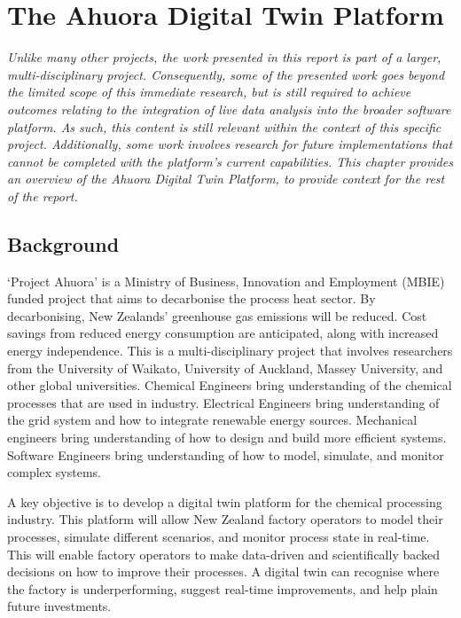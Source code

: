\chapter{The Ahuora Digital Twin Platform}


\textit{ Unlike many other projects, the work presented in this report is part of a larger, multi-disciplinary project. Consequently, some of the presented work goes beyond the limited scope of this immediate research, but is still required to achieve outcomes relating to the integration of live data analysis into the broader software platform. As such, this content is still relevant within the context of this specific project. Additionally, some work involves research for future implementations that cannot be completed with the platform's current capabilities. This chapter provides an overview of the Ahuora Digital Twin Platform, to provide context for the rest of the report.}

\section{Background}

`Project Ahuora' is a Ministry of Business, Innovation and Employment (MBIE) funded project that aims to decarbonise the process heat sector.
By decarbonising, New Zealands' greenhouse gas emissions will be reduced. Cost savings from reduced energy consumption are anticipated, along with increased energy independence.
This is a multi-disciplinary project that involves researchers from the University of Waikato, University of Auckland, Massey University,
and other global universities. Chemical Engineers bring understanding of the chemical processes that are used in industry. Electrical Engineers bring understanding of the grid system
and how to integrate renewable energy sources. Mechanical engineers bring understanding of how to design and build more efficient systems. Software Engineers bring understanding of how to
model, simulate, and monitor complex systems.

A key objective is to develop a digital twin platform for the chemical processing industry. This platform will allow New Zealand factory operators to model their processes, simulate different scenarios, and monitor process state in real-time.
This will enable factory operators to make data-driven and scientifically backed decisions on how to improve their processes. A digital twin can recognise where the factory is underperforming, suggest real-time improvements, and help plain future investments.

